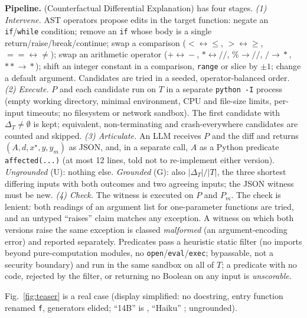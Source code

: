 \textbf{Pipeline.} \CoDE (Counterfactual Differential Explanation) has four stages.
\emph{(1) Intervene.} AST operators propose edits in the target function: negate an \texttt{if}/\texttt{while} condition;
remove an \texttt{if} whose body is a single return/raise/break/continue; swap a comparison
($<\!\leftrightarrow\!\le$, $>\!\leftrightarrow\!\ge$, $==\!\leftrightarrow\!\neq$); swap an arithmetic operator
($+\!\leftrightarrow\!-$, $*\!\leftrightarrow\!/\!/$, $\%\!\to\!/\!/$, $/\!\to\!*$, $**\!\to\!*$); shift an integer constant
in a comparison, \texttt{range} or slice by $\pm1$; change a default argument. Candidates are tried in a seeded,
operator-balanced order.
\emph{(2) Execute.} $P$ and each candidate run on $T$ in a separate \texttt{python -I} process (empty working directory,
minimal environment, CPU and file-size limits, per-input timeouts; no filesystem or network sandbox). The first candidate
with $\Delta_T\neq\emptyset$ is kept; equivalent, non-terminating and crash-everywhere candidates are counted and skipped.
\emph{(3) Articulate.} An LLM receives $P$ and the diff and returns $(A,d,x^\star,y,y_m)$ as JSON, and, in a separate
call, $A$ as a Python predicate \texttt{affected(...)} (at most 12 lines, told not to re-implement either version).
\emph{Ungrounded} (U): nothing else. \emph{Grounded} (G): also $|\Delta_T|/|T|$, the three shortest differing inputs
with both outcomes and two agreeing inputs; the JSON witness must be new.
\emph{(4) Check.} The witness is executed on $P$ and $P_m$. The check is lenient: both readings of an argument list for
one-parameter functions are tried, and an untyped ``raises'' claim matches any exception. A witness on which both versions
raise the same exception is classed \emph{malformed} (an argument-encoding error) and reported separately. Predicates
pass a heuristic static filter (no imports beyond pure-computation modules, no \texttt{open}/\texttt{eval}/\texttt{exec};
bypassable, not a security boundary) and run in the same sandbox on all of $T$; a predicate with no code, rejected by the
filter, or returning no Boolean on any input is \emph{unscorable}.

Fig.~\ref{fig:teaser} is a real case (display simplified: no docstring, entry function renamed \texttt{f}, generators
elided; ``14B'' is \GenModel, ``Haiku'' \StrongModel; ungrounded).
